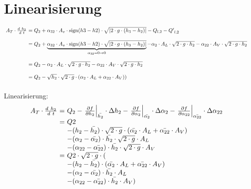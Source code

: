 \section{Linearisierung}
\[
\begin{array}{@{~}l@{~}l@{~}}
A_T \cdot \frac{d~h_2}{d~t} 
    &= Q_2 
    + \alpha_{32} \cdot A_v \cdot \sign(h3-h2) 
    \cdot \sqrt{|2 \cdot g \cdot (h_3 - h_2)|}
    - Q_{l,2}
    - {Q'}_{l,2} \\\\

    &= Q_2 
    + \underbrace{\alpha_{32} \cdot A_v \cdot \sign(h3-h2) 
    \cdot \sqrt{|2 \cdot g \cdot (h_3 - h_2)|}}
    _{\alpha_{32} = 0 \rightarrow 0} 
    - \alpha_{2} \cdot A_L \cdot \sqrt{2 \cdot g \cdot h_2}
    - \alpha_{22} \cdot A_V \cdot \sqrt{2 \cdot g \cdot h_2} \\\\

    &= Q_2 
    - \alpha_{2} \cdot A_L \cdot \sqrt{2 \cdot g \cdot h_2}
    - \alpha_{22} \cdot A_V \cdot \sqrt{2 \cdot g \cdot h_2} \\\\

    &= Q_2 - \sqrt{h_2} \cdot \sqrt{2 \cdot g} \cdot 
    (\alpha_2 \cdot A_L + \alpha_{22} \cdot A_V)) \\\\
\end{array}
\]
Linearisierung: 
\[
\begin{array}{@{~}l@{~}l@{~}l@{~}}
    A_T \cdot \frac{d~h_2}{d~t} 
    &=& Q_2 
    - \left. \frac{\partial f}{\partial h_2} \right\rvert_{\bar{h_2}} \cdot \Delta h_2
    - \left. \frac{\partial f}{\partial \alpha_{2}} \right\rvert_{\bar{\alpha_{2}}} \cdot \Delta \alpha_{2}
    - \left. \frac{\partial f}{\partial \alpha_{22}} \right\rvert_{\bar{\alpha_{22}}} \cdot \Delta \alpha_{22} \\

    &=& Q2 \\
    & & - (h_2 - \bar{h_2}) \cdot \sqrt{2 \cdot g} \cdot (\bar{\alpha_2} \cdot A_L + \bar{\alpha_{22}} \cdot A_V) \\
    & & - (\alpha_2 - \bar{\alpha_2}) \cdot \bar{h_2} \cdot \sqrt{2 \cdot g} \cdot A_L \\
    & & - (\alpha_{22} - \bar{\alpha_{22}}) \cdot \bar{h_2} \cdot \sqrt{2 \cdot g} \cdot A_V \\

    &=& Q2 \cdot \sqrt{2 \cdot g} \cdot ( \\
    & & - (h_2 - \bar{h_2}) \cdot (\bar{\alpha_2} \cdot A_L + \bar{\alpha_{22}} \cdot A_V) \\
    & & - (\alpha_2 - \bar{\alpha_2}) \cdot \bar{h_2} \cdot A_L \\
    & & - (\alpha_{22} - \bar{\alpha_{22}}) \cdot \bar{h_2} \cdot A_V ) \\
\end{array}
\]
